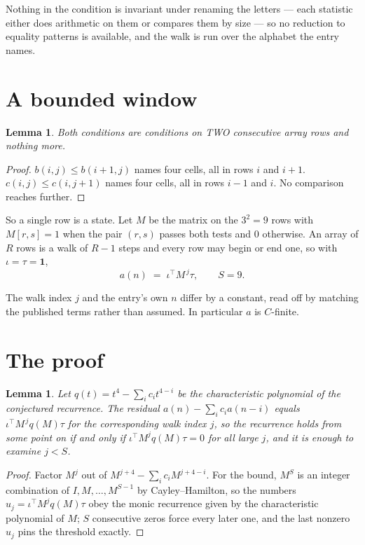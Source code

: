 \documentclass[11pt,a4paper]{article}
\theoremstyle{plain}
\newtheorem{lemma}[theorem]{Lemma}
\theoremstyle{definition}
\begin{document}
Nothing in the condition is invariant under renaming the letters --- each statistic either does
arithmetic on them or compares them by size --- so no reduction to equality patterns is
available, and the walk is run over the alphabet the entry names.

\section{A bounded window}

\begin{lemma}\label{lem:win}
Both conditions are conditions on TWO consecutive array rows and nothing more.
\end{lemma}

\begin{proof}
$b(i,j)\le b(i{+}1,j)$ names four cells, all in rows $i$ and $i+1$. $c(i,j)\le c(i,j{+}1)$
names four cells, all in rows $i-1$ and $i$. No comparison reaches further.
\end{proof}

So a single row is a state. Let $M$ be the matrix on the $3^{2}=9$ rows with
$M[r,s]=1$ when the pair $(r,s)$ passes both tests and $0$ otherwise. An array of $R$ rows is a
walk of $R-1$ steps and every row may begin or end one, so with $\iota=\tau=\mathbf{1}$,
\[
a(n)\;=\;\iota^{\!\top}M^{\,j}\tau ,\qquad S=9.
\]

The walk index $j$ and the entry's own $n$ differ by a constant, read off by matching the
published terms rather than assumed. In particular $a$ is $C$-finite.

\section{The proof}

\begin{lemma}\label{lem:crit}
Let $q(t)=t^{4}-\sum_i c_it^{4-i}$ be the characteristic polynomial of the
conjectured recurrence. The residual $a(n)-\sum_ic_ia(n-i)$ equals
$\iota^{\!\top}M^{\,j}q(M)\tau$ for the corresponding walk index $j$, so the recurrence
holds from some point on if and only if $\iota^{\!\top}M^{j}q(M)\tau=0$ for all large $j$,
and it is enough to examine $j<S$.
\end{lemma}

\begin{proof}
Factor $M^{j}$ out of $M^{j+4}-\sum_ic_iM^{j+4-i}$. For the bound, $M^{S}$
is an integer combination of $I,M,\dots,M^{S-1}$ by Cayley--Hamilton, so the numbers
$u_j=\iota^{\!\top}M^{j}q(M)\tau$ obey the monic recurrence given by the characteristic
polynomial of $M$; $S$ consecutive zeros force every later one, and the last nonzero $u_j$
pins the threshold exactly.
\end{proof}
\end{document}
